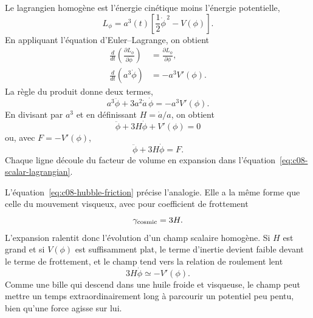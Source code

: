 Le lagrangien homogène est l’énergie cinétique moins l’énergie potentielle,
\begin{equation}
L_\phi=a^3(t)
\left[
\frac12\dot\phi^{\,2}-V(\phi)
\right].
\label{eq:c08-scalar-lagrangian}
\end{equation}En appliquant l’équation d’Euler--Lagrange, on obtient
\begin{align}
\frac{d}{dt}\left(\frac{\partial L_\phi}{\partial\dot\phi}\right)
&=
\frac{\partial L_\phi}{\partial\phi},\\
\frac{d}{dt}\left(a^3\dot\phi\right)
&=-a^3V'(\phi).
\end{align}La règle du produit donne deux termes,
\begin{equation}
a^3\ddot\phi+3a^2\dot a\,\dot\phi
=-a^3V'(\phi).
\end{equation}En divisant par \(a^3\) et en définissant \(H=\dot a/a\), on obtient
\begin{equation}
\boxed{
\ddot\phi+3H\dot\phi+V'(\phi)=0
}
\label{eq:c08-hubble-friction}
\end{equation}ou, avec \(F=-V'(\phi)\),
\begin{equation}
\ddot\phi+3H\dot\phi=F.
\end{equation}Chaque ligne découle du facteur de volume en expansion dans l’équation~\eqref{eq:c08-scalar-lagrangian}.

\begin{classroomqa}
\end{classroomqa}

L’équation~\eqref{eq:c08-hubble-friction} précise l’analogie. Elle a la même forme que celle du mouvement visqueux, avec pour coefficient de frottement
\begin{equation}
\gamma_{\rm cosmic}=3H.
\end{equation}L’expansion ralentit donc l’évolution d’un champ scalaire homogène. Si \(H\) est grand et si \(V(\phi)\) est suffisamment plat, le terme d’inertie devient faible devant le terme de frottement, et le champ tend vers la relation de roulement lent
\begin{equation}
3H\dot\phi\simeq-V'(\phi).
\end{equation}Comme une bille qui descend dans une huile froide et visqueuse, le champ peut mettre un temps extraordinairement long à parcourir un potentiel peu pentu, bien qu’une force agisse sur lui.

